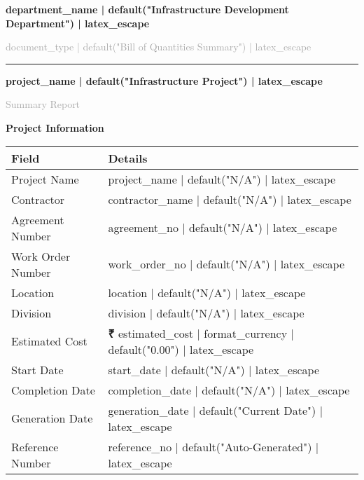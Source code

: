 \documentclass[a4paper,11pt]{article}
\newcommand{\rupee}{\textbf{₹}}
\newcommand{\primaryheader}[1]{\textcolor{primarygreen}{\textbf{\large #1}}}
\begin{document}
\begin{center}
    {\Huge \textcolor{primarygreen}{\textbf{{{ department_name | default("Infrastructure Development Department") | latex_escape }}}}}
    
    \vspace{0.5cm}
    {\Large \textcolor{darkgray}{{{ document_type | default("Bill of Quantities Summary") | latex_escape }}}}
    
    \vspace{1cm}
    \rule{\textwidth}{2pt}
    \vspace{0.5cm}
    
    {\LARGE \textbf{{{ project_name | default("Infrastructure Project") | latex_escape }}}}
    
    \vspace{0.3cm}
    {\large \textcolor{darkgray}{Summary Report}}
\end{center}

\vspace{1cm}

\primaryheader{Project Information}
\vspace{0.3cm}

\begin{longtable}{|p{5cm}|p{8cm}|}
\hline
\rowcolor{lightgray}
\textbf{Field} & \textbf{Details} \\
\hline
Project Name & {{ project_name | default("N/A") | latex_escape }} \\
\hline
Contractor & {{ contractor_name | default("N/A") | latex_escape }} \\
\hline
Agreement Number & {{ agreement_no | default("N/A") | latex_escape }} \\
\hline
Work Order Number & {{ work_order_no | default("N/A") | latex_escape }} \\
\hline
Location & {{ location | default("N/A") | latex_escape }} \\
\hline
Division & {{ division | default("N/A") | latex_escape }} \\
\hline
Estimated Cost & \rupee{{ estimated_cost | format_currency | default("0.00") | latex_escape }} \\
\hline
Start Date & {{ start_date | default("N/A") | latex_escape }} \\
\hline
Completion Date & {{ completion_date | default("N/A") | latex_escape }} \\
\hline
Generation Date & {{ generation_date | default("Current Date") | latex_escape }} \\
\hline
Reference Number & {{ reference_no | default("Auto-Generated") | latex_escape }} \\
\hline
\end{longtable}
\end{document}
